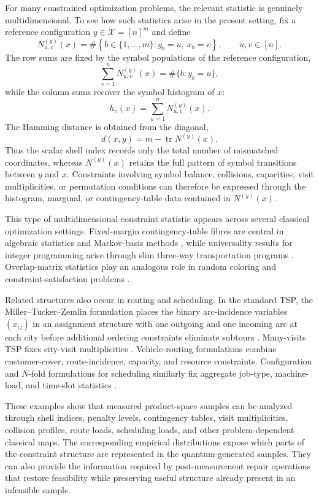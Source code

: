\documentclass[a4paper,onecolumn,11pt,unpublished]{quantumarticle}
\theoremstyle{remark}
\begin{document}
For many constrained optimization problems, the relevant statistic is
genuinely multidimensional. To see how such statistics arise in the present
setting, fix a reference configuration \(y\in \mathcal X=[n]^m\) and define
\[
N^{(y)}_{u,v}(x)
=
\#\left\{
b\in\{1,\ldots,m\}:
y_b=u,\ x_b=v
\right\},
\qquad u,v\in[n].
\]
The row sums are fixed by the symbol populations of the reference
configuration,
\[
\sum_{v=1}^{n}N^{(y)}_{u,v}(x)
=
\#\{b:y_b=u\},
\]
while the column sums recover the symbol histogram of \(x\):
\[
h_v(x)
=
\sum_{u=1}^{n}N^{(y)}_{u,v}(x).
\]
The Hamming distance is obtained from the diagonal,
\[
d(x,y)
=
m-\operatorname{tr}N^{(y)}(x).
\]
Thus the scalar shell index records only the total number of mismatched
coordinates, whereas \(N^{(y)}(x)\) retains the full pattern of symbol
transitions between \(y\) and \(x\). Constraints involving symbol balance,
collisions, capacities, visit multiplicities, or permutation conditions can
therefore be expressed through the histogram, marginal, or contingency-table
data contained in \(N^{(y)}(x)\).

This type of multidimensional constraint statistic appears across several
classical optimization settings. Fixed-margin contingency-table fibres are
central in algebraic statistics and Markov-basis methods
\cite{DiaconisSturmfels1998,DeLoeraOnn2004,
SlavkovicZhuPetrovic2015}, while universality results for integer programming arise through slim three-way transportation programs
\cite{DeLoeraOnn2006}. Overlap-matrix statistics play an analogous role in
random coloring and constraint-satisfaction problems
\cite{AchlioptasCojaOghlan2008,CojaOghlanVilenchik2016}.

Related structures also occur in routing and scheduling. In the standard TSP,
the Miller--Tucker--Zemlin formulation places the binary arc-incidence
variables \((x_{ij})\) in an assignment structure with one outgoing and one
incoming arc at each city before additional ordering constraints eliminate
subtours \cite{MillerTuckerZemlin1960}. Many-visits TSP fixes city-visit
multiplicities \cite{CosmadakisPapadimitriou1984}. Vehicle-routing
formulations combine customer-cover, route-incidence, capacity, and resource
constraints. Configuration and \(N\)-fold formulations for scheduling
similarly fix aggregate job-type, machine-load, and time-slot statistics
\cite{MnichWiese2015,KnopKoutecky2018}.

These examples show that measured product-space samples can be analyzed
through shell indices, penalty levels, contingency tables, visit
multiplicities, collision profiles, route loads, scheduling loads, and other
problem-dependent classical maps. The corresponding empirical distributions
expose which parts of the constraint structure are represented in the
quantum-generated samples. They can also provide the information required by
post-measurement repair operations that restore feasibility while preserving
useful structure already present in an infeasible sample.
\end{document}
